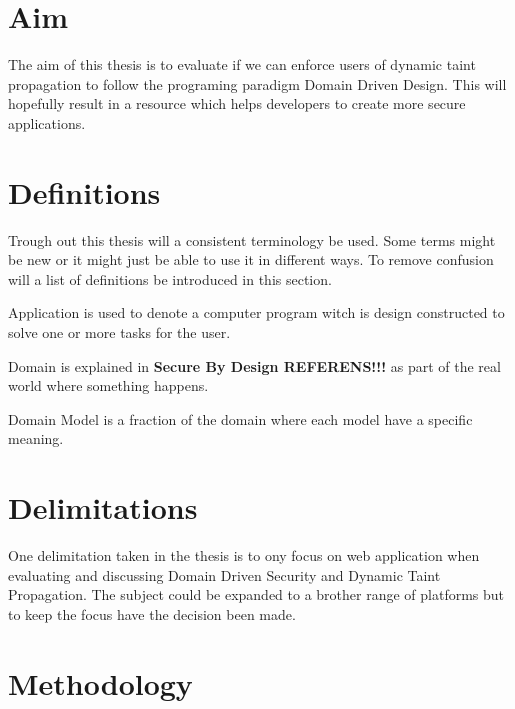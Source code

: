 \section{Aim}
The aim of this thesis is to evaluate if we can enforce users of dynamic taint propagation to follow the programing paradigm Domain Driven Design. This will hopefully result in a resource which helps developers to create more secure applications.


\section{Definitions}
Trough out this thesis will a consistent terminology be used. Some terms might be new or it might just be able to use it in different ways. To remove confusion will a list of definitions be introduced in this section.

\begin{definition}{Application} 
	is used to denote a computer program witch is design constructed to solve one or more tasks for the user.
\end{definition}

\begin{definition}{Domain}
	is explained in \textbf{Secure By Design REFERENS!!!} as part of the real world where something happens.
\end{definition}

\begin{definition}{Domain Model}
	is a fraction of the domain where each model have a specific meaning.
\end{definition}


\section{Delimitations}
One delimitation taken in the thesis is to ony focus on web application when evaluating and discussing Domain Driven Security and Dynamic Taint Propagation. The subject could be expanded to a brother range of platforms but to keep the focus have the decision been made.


\section{Methodology}
